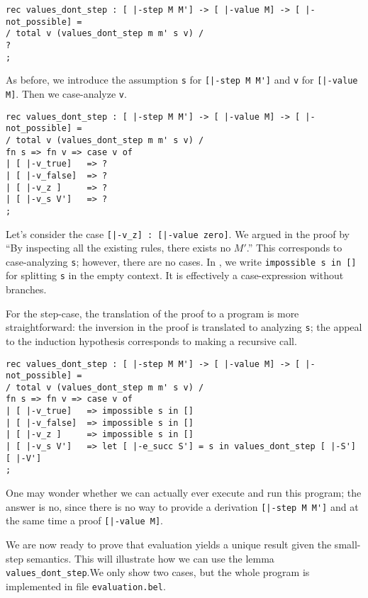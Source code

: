 \begin{lstlisting}
rec values_dont_step : [ |-step M M'] -> [ |-value M] -> [ |-not_possible] =
/ total v (values_dont_step m m' s v) /
?
;
\end{lstlisting}

As before, we introduce the assumption \lstinline!s! for
\lstinline![|-step M M']! and \lstinline!v! for
\lstinline![|-value M]!. Then we case-analyze \lstinline!v!.

\begin{lstlisting}
rec values_dont_step : [ |-step M M'] -> [ |-value M] -> [ |-not_possible] =
/ total v (values_dont_step m m' s v) /
fn s => fn v => case v of
| [ |-v_true]   => ?
| [ |-v_false]  => ?
| [ |-v_z ]     => ?
| [ |-v_s V']   => ?
;
\end{lstlisting}

Let's consider the case \lstinline![|-v_z] : [|-value zero]!. We argued in the
proof by ``By inspecting all the existing rules, there exists no $M'$.'' This
corresponds to case-analyzing \lstinline!s!; however, there are no cases. In
\beluga, we write \lstinline!impossible s in []! for splitting \lstinline!s! in
the empty context. It is effectively a case-expression without branches.

For the step-case, the translation of the proof to a program is more
straightforward: the inversion in the proof is translated to analyzing
\lstinline!s!; the appeal to the induction hypothesis corresponds to making a
recursive call.

\begin{lstlisting}
rec values_dont_step : [ |-step M M'] -> [ |-value M] -> [ |-not_possible] =
/ total v (values_dont_step m m' s v) /
fn s => fn v => case v of
| [ |-v_true]   => impossible s in []
| [ |-v_false]  => impossible s in []
| [ |-v_z ]     => impossible s in []
| [ |-v_s V']   => let [ |-e_succ S'] = s in values_dont_step [ |-S'] [ |-V']
;
\end{lstlisting}

One may wonder whether we can actually ever execute and run this program; the
answer is no, since there is no way to provide a derivation
\lstinline![|-step M M']! and at the same time a proof \lstinline![|-value M]!.


We are now ready to prove that evaluation yields a unique result given the
small-step semantics. This will illustrate how we can use the lemma \lstinline!values_dont_step!.We only show two cases, but the whole program is
implemented in file \lstinline!evaluation.bel!.

